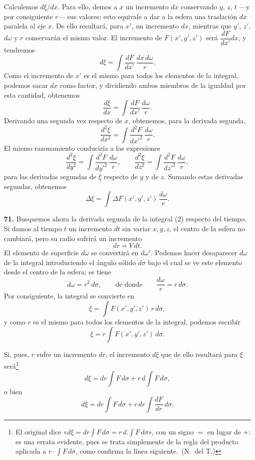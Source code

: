 Calculemos $d\xi/dx$. Para ello, demos a $x$ un
incremento $dx$ conservando $y$, $z$, $t$ —y por consiguiente $r$— sus
valores; esto equivale a dar a la esfera una traslación $dx$ paralela al
eje $x$. De ello resultará, para $x'$, un incremento $dx$, mientras que
$y'$, $z'$, $d\omega$ y $r$ conservarán el mismo valor. El incremento de
$F(x',y',z')$ será $\dfrac{dF}{dx'}dx$, y tendremos
\[
d\xi = \int \frac{dF}{dx'}\,\frac{dx\,d\omega}{r}.
\]
Como el incremento de $x'$ es el mismo para todos los elementos de la
integral, podemos sacar $dx$ como factor, y dividiendo ambos miembros de la
igualdad por esta cantidad, obtenemos
\[
\frac{d\xi}{dx} = \int \frac{dF}{dx'}\,\frac{d\omega}{r}.
\]
Derivando una segunda vez respecto de $x$, obtenemos, para la derivada
segunda,
\[
\frac{d^2\xi}{dx^2} = \int \frac{d^2F}{dx'^2}\,\frac{d\omega}{r}.
\]
El mismo razonamiento conduciría a las expresiones
\[
\frac{d^2\xi}{dy^2} = \int \frac{d^2F}{dy'^2}\,\frac{d\omega}{r},\qquad
\frac{d^2\xi}{dz^2} = \int \frac{d^2F}{dz'^2}\,\frac{d\omega}{r},
\]
para las derivadas segundas de $\xi$ respecto de $y$ y de $z$. Sumando
estas derivadas segundas, obtenemos
\[
\Delta\xi = \int \Delta F(x',y',z')\,\frac{d\omega}{r}. \tag{3}
\]

\noindent\textbf{71.} Busquemos ahora la derivada segunda de la integral
(2) respecto del tiempo. Si damos al tiempo $t$ un incremento $dt$ sin
variar $x,y,z$, el centro de la esfera no cambiará, pero su radio sufrirá
un incremento
\[
dr = V\,dt.
\]
El elemento de superficie $d\omega$ se convertirá en $d\omega'$. Podemos
hacer desaparecer $d\omega$ de la integral introduciendo el ángulo sólido
$d\sigma$ bajo el cual se ve este elemento desde el centro de la esfera; se
tiene
\[
d\omega = r^2\,d\sigma,\qquad\text{de donde}\qquad \frac{d\omega}{r}=r\,d\sigma.
\]
Por consiguiente, la integral se convierte en
\[
\xi = \int F(x',y',z')\,r\,d\sigma, \tag{4}
\]
y como $r$ es el mismo para todos los elementos de la integral, podemos
escribir
\[
\xi = r\int F(x',y',z')\,d\sigma.
\]

Si, pues, $r$ sufre un incremento $dr$, el incremento $d\xi$ que de ello
resultará para $\xi$ será\footnote{El original dice
«$d\xi = dr\int F\,d\sigma = r\,d.\!\int F\,d\sigma$», con un signo $=$ en
lugar de $+$: es una errata evidente, pues se trata simplemente de la regla
del producto aplicada a $r\cdot\int F\,d\sigma$, como confirma la línea
siguiente.~(N.~del T.)}
\[
d\xi = dr\int F\,d\sigma + r\,d\!\int F\,d\sigma,
\]
o bien
\[
d\xi = dr\int F\,d\sigma + r\,dr\int \frac{dF}{dr}\,d\sigma.
\]

